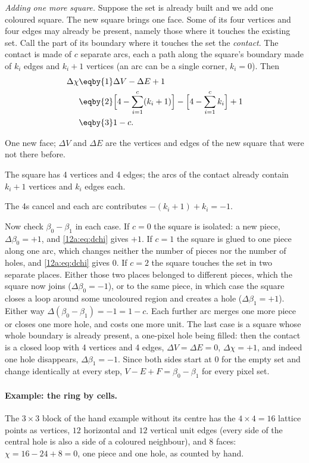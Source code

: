 \emph{Adding one more square.} Suppose the set is already built and we add one coloured square. The new
square brings one face. Some of its four vertices and four edges may already be present, namely those where
it touches the existing set. Call the part of its boundary where it touches the set the \emph{contact}. The
contact is made of $c$ separate arcs, each a path along the square's boundary made of $k_i$ edges and
$k_i+1$ vertices (an arc can be a single corner, $k_i=0$). Then
\begin{align}
  \Delta\chi
  &\eqby{1}\Delta V-\Delta E+1\nonumber\\
  &\eqby{2}\Big[4-\sum_{i=1}^{c}(k_i+1)\Big]-\Big[4-\sum_{i=1}^{c}k_i\Big]+1\nonumber\\
  &\eqby{3}1-c .
  \label{12a:eq:dchi}
\end{align}
\begin{explain}
  \item One new face; $\Delta V$ and $\Delta E$ are the vertices and edges of the new square that were not
        there before.
  \item The square has 4 vertices and 4 edges; the arcs of the contact already contain $k_i+1$ vertices and
        $k_i$ edges each.
  \item The 4s cancel and each arc contributes $-(k_i+1)+k_i=-1$.
\end{explain}
Now check $\beta_0-\beta_1$ in each case. If $c=0$ the square is isolated: a new piece, $\Delta\beta_0=+1$,
and \eqref{12a:eq:dchi} gives $+1$. If $c=1$ the square is glued to one piece along one arc, which changes
neither the number of pieces nor the number of holes, and \eqref{12a:eq:dchi} gives $0$. If $c=2$ the
square touches the set in two separate places. Either those two places belonged to different pieces, which
the square now joins ($\Delta\beta_0=-1$), or to the same piece, in which case the square closes a loop around
some uncoloured region and creates a hole ($\Delta\beta_1=+1$). Either way $\Delta(\beta_0-\beta_1)=-1=1-c$.
Each further arc merges one more piece or closes one more hole, and costs one more unit. The last case is a
square whose whole boundary is already present, a one-pixel hole being filled: then the contact is a closed
loop with 4 vertices and 4 edges, $\Delta V=\Delta E=0$, $\Delta\chi=+1$, and indeed one hole disappears,
$\Delta\beta_1=-1$. Since both sides start at $0$ for the empty set and change identically at every step,
$V-E+F=\beta_0-\beta_1$ for every pixel set.

\paragraph{Example: the ring by cells.} The $3\times3$ block of the hand example without its centre has the
$4\times4=16$ lattice points as vertices, $12$ horizontal and $12$ vertical unit edges (every side of the
central hole is also a side of a coloured neighbour), and $8$ faces: $\chi=16-24+8=0$, one piece and one hole,
as counted by hand.

